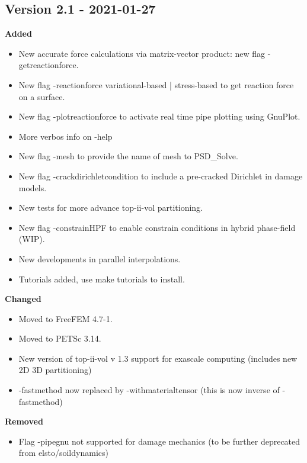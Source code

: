\subsection{Version 2.1 - 2021-01-27}
\textbf{Added}
\begin{itemize}
    \item New accurate force calculations via matrix-vector product: new flag {\ttfamily -getreactionforce}.
    \item New flag {\ttfamily  -reactionforce} variational-based | stress-based to get reaction force on a surface.
    \item New flag {\ttfamily  -plotreactionforce} to activate real time pipe plotting using GnuPlot.
    \item More verbos info on {\ttfamily -help}    
    \item New flag {\ttfamily -mesh} to provide the name of mesh to {\ttfamily PSD\_Solve}.  
    \item New flag {\ttfamily -crackdirichletcondition} to include a pre-cracked Dirichlet in damage models.
    \item New tests for more advance top-ii-vol partitioning.
    \item New flag {\ttfamily -constrainHPF} to enable constrain conditions in hybrid phase-field (WIP).
    \item New developments in parallel interpolations.
    \item Tutorials added, use {\ttfamily make tutorials} to install.

\end{itemize}
\textbf{Changed}
\begin{itemize}
	\item Moved to FreeFEM 4.7-1.
	\item Moved to PETSc 3.14.
	\item New version of top-ii-vol v 1.3 support for exascale computing (includes new 2D 3D partitioning)
	\item {\ttfamily-fastmethod}  now replaced by {\ttfamily-withmaterialtensor} (this is now inverse of {\ttfamily-fastmethod})	
\end{itemize}
\textbf{Removed}
\begin{itemize}
    \item Flag {\ttfamily-pipegnu} not supported for damage mechanics (to be further deprecated from elsto/soildynamics) 
\end{itemize}
